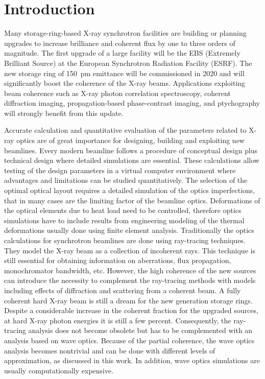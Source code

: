\documentclass{iucr}              %
\begin{document}

\section{Introduction}

Many storage-ring-based X-ray synchrotron facilities are building or planning upgrades to increase brilliance and coherent flux by one to three orders of magnitude.  The first upgrade of a large facility will be the EBS (Extremely Brilliant Source) \cite{orangebook} at the European Synchrotron Radiation Facility (ESRF). The new storage ring of 150~pm emittance will be commissioned in 2020 and will significantly boost the coherence of the X-ray beams. Applications exploiting beam coherence such as X-ray photon correlation spectroscopy, coherent diffraction imaging, propagation-based phase-contrast imaging, and ptychography will strongly benefit from this update.  

Accurate calculation and quantitative evaluation of the parameters related to X-ray optics are of great importance for designing, building and exploiting new beamlines. Every modern beamline follows a procedure of conceptual design plus technical design where detailed simulations are essential. These calculations allow testing of the design parameters in a virtual computer environment where advantages and limitations can be studied quantitatively. The selection of the optimal optical layout requires a detailed simulation of the optics imperfections, that in many cases are the limiting factor of the beamline optics. Deformations of the optical elements due to heat load need to be controlled, therefore optics simulations have to include results from engineering modeling of the thermal deformations usually done using finite element analysis. Traditionally the optics calculations for synchrotron beamlines are done using ray-tracing techniques. They model the X-ray beam as a collection of incoherent rays. This technique is still essential for obtaining information on aberrations, flux propagation, monochromator bandwidth, etc. However, the high coherence of the new sources can introduce the necessity to complement the ray-tracing methods with models including effects of diffraction and scattering from a coherent beam. A fully coherent hard X-ray beam is still a dream for the new generation storage rings. Despite a considerable increase in the coherent fraction for the upgraded sources, at hard X-ray photon energies it is still a few percent. Consequently, the ray-tracing analysis does not become obsolete but has to be complemented with an analysis based on wave optics. Because of the partial coherence, the wave optics analysis becomes nontrivial and can be done with different levels of approximation, as discussed in this work. In addition, wave optics simulations are usually computationally expensive.
\end{document}
